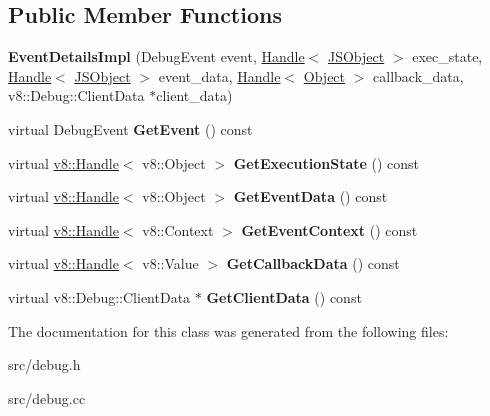 \subsection*{Public Member Functions}
\begin{DoxyCompactItemize}
\item 
\hypertarget{classv8_1_1internal_1_1_event_details_impl_a036fc63c4a28bcc137400a11deba3424}{}{\bfseries Event\+Details\+Impl} (Debug\+Event event, \hyperlink{classv8_1_1internal_1_1_handle}{Handle}$<$ \hyperlink{classv8_1_1internal_1_1_j_s_object}{J\+S\+Object} $>$ exec\+\_\+state, \hyperlink{classv8_1_1internal_1_1_handle}{Handle}$<$ \hyperlink{classv8_1_1internal_1_1_j_s_object}{J\+S\+Object} $>$ event\+\_\+data, \hyperlink{classv8_1_1internal_1_1_handle}{Handle}$<$ \hyperlink{classv8_1_1internal_1_1_object}{Object} $>$ callback\+\_\+data, v8\+::\+Debug\+::\+Client\+Data $\ast$client\+\_\+data)\label{classv8_1_1internal_1_1_event_details_impl_a036fc63c4a28bcc137400a11deba3424}

\item 
\hypertarget{classv8_1_1internal_1_1_event_details_impl_a135085e7265cc9932ad6065649d6ffef}{}virtual Debug\+Event {\bfseries Get\+Event} () const \label{classv8_1_1internal_1_1_event_details_impl_a135085e7265cc9932ad6065649d6ffef}

\item 
\hypertarget{classv8_1_1internal_1_1_event_details_impl_a1958dc5acb7c238ce300b56d6a721c47}{}virtual \hyperlink{classv8_1_1_handle}{v8\+::\+Handle}$<$ v8\+::\+Object $>$ {\bfseries Get\+Execution\+State} () const \label{classv8_1_1internal_1_1_event_details_impl_a1958dc5acb7c238ce300b56d6a721c47}

\item 
\hypertarget{classv8_1_1internal_1_1_event_details_impl_a3c4e8a5df6a10b59d4476b04bf829f3f}{}virtual \hyperlink{classv8_1_1_handle}{v8\+::\+Handle}$<$ v8\+::\+Object $>$ {\bfseries Get\+Event\+Data} () const \label{classv8_1_1internal_1_1_event_details_impl_a3c4e8a5df6a10b59d4476b04bf829f3f}

\item 
\hypertarget{classv8_1_1internal_1_1_event_details_impl_ac0454267c61e87839a369739720cbd11}{}virtual \hyperlink{classv8_1_1_handle}{v8\+::\+Handle}$<$ v8\+::\+Context $>$ {\bfseries Get\+Event\+Context} () const \label{classv8_1_1internal_1_1_event_details_impl_ac0454267c61e87839a369739720cbd11}

\item 
\hypertarget{classv8_1_1internal_1_1_event_details_impl_a8f216b8e2e5d1448b6db17c38d4792a3}{}virtual \hyperlink{classv8_1_1_handle}{v8\+::\+Handle}$<$ v8\+::\+Value $>$ {\bfseries Get\+Callback\+Data} () const \label{classv8_1_1internal_1_1_event_details_impl_a8f216b8e2e5d1448b6db17c38d4792a3}

\item 
\hypertarget{classv8_1_1internal_1_1_event_details_impl_a562a0107f0d37a400eaf92031d829218}{}virtual v8\+::\+Debug\+::\+Client\+Data $\ast$ {\bfseries Get\+Client\+Data} () const \label{classv8_1_1internal_1_1_event_details_impl_a562a0107f0d37a400eaf92031d829218}

\end{DoxyCompactItemize}


The documentation for this class was generated from the following files\+:\begin{DoxyCompactItemize}
\item 
src/debug.\+h\item 
src/debug.\+cc\end{DoxyCompactItemize}
